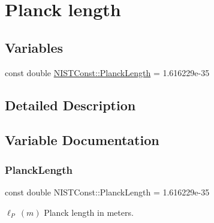 \hypertarget{group___n_i_s_t_const-_planck_length}{}\section{Planck length}
\label{group___n_i_s_t_const-_planck_length}
\subsection*{Variables}
\begin{DoxyCompactItemize}
\item 
const double \hyperlink{group___n_i_s_t_const-_planck_length_ga1bc5c33e67f9810e7505b30076df5ca3}{N\+I\+S\+T\+Const\+::\+Planck\+Length} = 1.\+616229e-\/35
\end{DoxyCompactItemize}


\subsection{Detailed Description}


\subsection{Variable Documentation}
\mbox{\label{group___n_i_s_t_const-_planck_length_ga1bc5c33e67f9810e7505b30076df5ca3}} 
\subsubsection{\texorpdfstring{Planck\+Length}{PlanckLength}}
{\footnotesize\ttfamily const double N\+I\+S\+T\+Const\+::\+Planck\+Length = 1.\+616229e-\/35}

$\ell_P \ (m)$ Planck length in meters. 